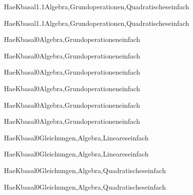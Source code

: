 \documentclass[12pt]{article}
\begin{document}
\begin{Add}{HaeK}{basal1.1}{Algebra,Grundoperationen,Quadratisches}{einfach}
\solution{ }
\end{Add}
\begin{Add}{HaeK}{basal1.1}{Algebra,Grundoperationen,Quadratisches}{einfach}
\end{Add}

\begin{Add}{HaeK}{basal0}{Algebra,Grundoperationen}{einfach}
\solution{ }
\end{Add}
\begin{Add}{HaeK}{basal0}{Algebra,Grundoperationen}{einfach}
\end{Add}

\begin{Add}{HaeK}{basal0}{Algebra,Grundoperationen}{einfach}
\solution{ }
\end{Add}
\begin{Add}{HaeK}{basal0}{Algebra,Grundoperationen}{einfach}
\end{Add}

\begin{Add}{HaeK}{basal0}{Algebra,Grundoperationen}{einfach}
\solution{ }
\end{Add}
\begin{Add}{HaeK}{basal0}{Algebra,Grundoperationen}{einfach}
\end{Add}

\begin{Add}{HaeK}{basal0}{Gleichungen,Algebra,Lineares}{einfach}
\solution{ }
\end{Add}
\begin{Add}{HaeK}{basal0}{Gleichungen,Algebra,Lineares}{einfach}
\end{Add}

\begin{Add}{HaeK}{basal0}{Gleichungen,Algebra,Quadratisches}{einfach}
\solution{ }
\end{Add}
\begin{Add}{HaeK}{basal0}{Gleichungen,Algebra,Quadratisches}{einfach}
\end{Add}
\end{document}

